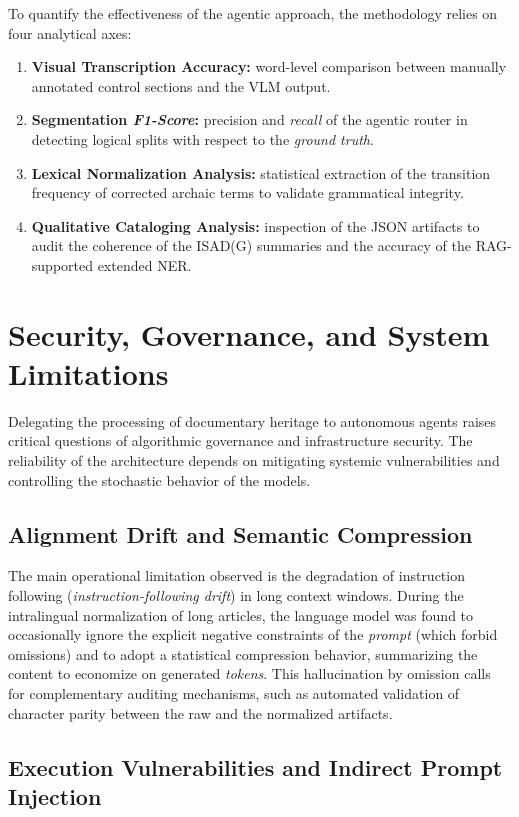 \documentclass[conference]{IEEEtran}
\begin{document}
To quantify the effectiveness of the agentic approach, the methodology relies on four analytical axes:
\begin{enumerate}
    \item \textbf{Visual Transcription Accuracy:} word-level comparison between manually annotated control sections and the VLM output.
    \item \textbf{Segmentation \textit{F1-Score}:} precision and \textit{recall} of the agentic router in detecting logical splits with respect to the \textit{ground truth}.
    \item \textbf{Lexical Normalization Analysis:} statistical extraction of the transition frequency of corrected archaic terms to validate grammatical integrity.
    \item \textbf{Qualitative Cataloging Analysis:} inspection of the JSON artifacts to audit the coherence of the ISAD(G) summaries and the accuracy of the RAG-supported extended NER.
\end{enumerate}

\section{Security, Governance, and System Limitations}

Delegating the processing of documentary heritage to autonomous agents raises critical questions of algorithmic governance and infrastructure security. The reliability of the architecture depends on mitigating systemic vulnerabilities and controlling the stochastic behavior of the models.

\subsection{Alignment Drift and Semantic Compression}

The main operational limitation observed is the degradation of instruction following (\textit{instruction-following drift}) in long context windows. During the intralingual normalization of long articles, the language model was found to occasionally ignore the explicit negative constraints of the \textit{prompt} (which forbid omissions) and to adopt a statistical compression behavior, summarizing the content to economize on generated \textit{tokens}. This hallucination by omission calls for complementary auditing mechanisms, such as automated validation of character parity between the raw and the normalized artifacts.

\subsection{Execution Vulnerabilities and Indirect Prompt Injection}
\end{document}
